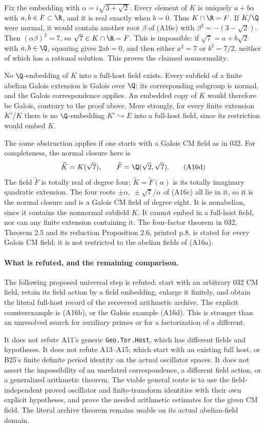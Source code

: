 Fix the embedding with $\alpha=i\sqrt{3+\sqrt2}$.
Every element of $K$ is uniquely $a+b\alpha$ with
$a,b\in F\subset\R$, and it is real exactly when
$b=0$. Thus $K\cap\R=F$. If $K/\Q$ were normal,
it would contain another root $\beta$ of (A16c) with
$\beta^2=-(3-\sqrt2)$. Then
$(\alpha\beta)^2=7$, so $\sqrt7\in K\cap\R=F$.
This is impossible: if $\sqrt7=a+b\sqrt2$ with
$a,b\in\Q$, squaring gives $2ab=0$, and then either
$a^2=7$ or $b^2=7/2$, neither of which has a rational
solution. This proves the claimed nonnormality.

No $\Q$-embedding of $K$ into a full-host field exists.
Every subfield of a finite abelian Galois extension is
Galois over $\Q$: its corresponding subgroup is normal,
and the Galois correspondence applies. An embedded copy
of $K$ would therefore be Galois, contrary to the proof
above. More strongly, for every finite extension
$K'/K$ there is no $\Q$-embedding $K'\hookrightarrow E$
into a full-host field, since its restriction would
embed $K$.

The same obstruction applies if one starts with a
Galois CM field as in 032. For completeness, the normal
closure here is
\[
       \widetilde K=K(\sqrt7),\qquad
       \widetilde F=\Q(\sqrt2,\sqrt7).
 \tag{A16d}
\]
The field $\widetilde F$ is totally real of degree four;
$\widetilde K=\widetilde F(\alpha)$ is its totally
imaginary quadratic extension. The four roots
$\pm\alpha,\ \pm\sqrt7/\alpha$ of (A16c) all lie
in it, so it is the normal closure and is a Galois
CM field of degree eight. It is nonabelian, since it
contains the nonnormal subfield $K$. It cannot embed
in a full-host field, nor can any finite extension
containing it. The four-factor theorem in 032,
Theorem 2.5 and its reduction Proposition 2.6, printed p.8,
is stated for every Galois CM field; it is not
restricted to the abelian fields of (A16a).

\paragraph{What is refuted, and the remaining comparison.}
The following proposed universal step is refuted:
start with an arbitrary 032 CM field, retain its field
action by a field embedding, enlarge it finitely, and
obtain the literal full-host record of the recovered
arithmetic archive. The explicit counterexample is
(A16b), or the Galois example (A16d). This is stronger
than an unresolved search for auxiliary primes or
for a factorization of a different.

It does not refute A11's generic
\texttt{Geo.Tor.Host}, which has different fields and
hypotheses. It does not refute A13--A15, which start
with an existing full host, or B25's finite definite
period identity on the actual oscillator spaces.
It does not assert the impossibility of an unrelated
correspondence, a different field action, or a
generalized arithmetic theorem. The viable general
route is to use the field-independent proved
oscillator and finite-transform identities with
their own explicit hypotheses, and prove the needed
arithmetic estimates for the given CM field. The
literal archive theorem remains usable on its actual
abelian-field domain.

